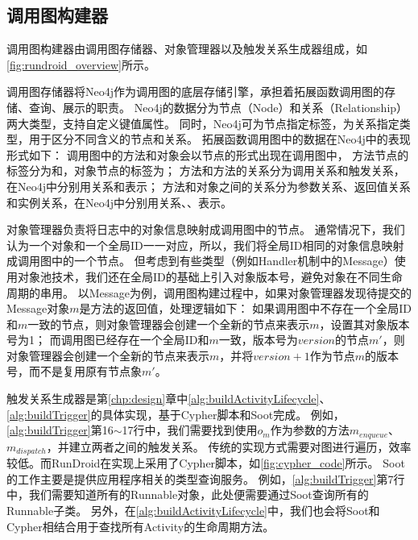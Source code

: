 \subsection{调用图构建器}

调用图构建器由调用图存储器、对象管理器以及触发关系生成器组成，如\autoref{fig:rundroid_overview}所示。

调用图存储器将Neo4j\cite{Neo4jthe19}作为调用图的底层存储引擎，承担着拓展函数调用图的存储、查询、展示的职责。
Neo4j的数据分为节点（Node）和关系（Relationship）两大类型，支持自定义键值属性。
同时，Neo4j可为节点指定标签，为关系指定类型，用于区分不同含义的节点和关系。
拓展函数调用图中的数据在Neo4j中的表现形式如下：
调用图中的方法和对象会以节点的形式出现在调用图中， 方法节点的标签分为和，对象节点的标签为；
方法和方法的关系分为调用关系和触发关系，在Neo4j中分别用关系和表示；
方法和对象之间的关系分为参数关系、返回值关系和实例关系，在Neo4j中分别用关系、、表示。






对象管理器负责将日志中的对象信息映射成调用图中的节点。
通常情况下，我们认为一个对象和一个全局ID一一对应，所以，我们将全局ID相同的对象信息映射成调用图中的一个节点。
但考虑到有些类型（例如Handler机制中的Message）使用对象池技术，我们还在全局ID的基础上引入对象版本号，避免对象在不同生命周期的串用。
以Message为例，调用图构建过程中，如果对象管理器发现待提交的Message对象$m$是方法的返回值，处理逻辑如下：
如果调用图中不存在一个全局ID和$m$一致的节点，则对象管理器会创建一个全新的节点来表示$m$，设置其对象版本号为1；
而调用图已经存在一个全局ID和$m$一致，版本号为$version$的节点$m'$，则对象管理器会创建一个全新的节点来表示$m$，并将$version + 1$作为节点$m$的版本号，而不是复用原有节点象$m'$。

触发关系生成器是第\ref{chp:design}章中\autoref{alg:buildActivityLifecycle}、\autoref{alg:buildTrigger}的具体实现，基于Cypher脚本和Soot完成。
例如，\autoref{alg:buildTrigger}第16$\sim$17行中，我们需要找到使用$o_{m}$作为参数的方法$m_{enqueue}$、$m_{dispatch}$，并建立两者之间的触发关系。
传统的实现方式需要对图进行遍历，效率较低。而RunDroid在实现上采用了Cypher脚本，如\autoref{fig:cypher_code}所示。
Soot的工作主要是提供应用程序相关的类型查询服务。
例如，\autoref{alg:buildTrigger}第7行中，我们需要知道所有的Runnable对象，此处便需要通过Soot查询所有的Runnable子类。
另外，在\ref{alg:buildActivityLifecycle}中，我们也会将Soot和Cypher相结合用于查找所有Activity的生命周期方法。


